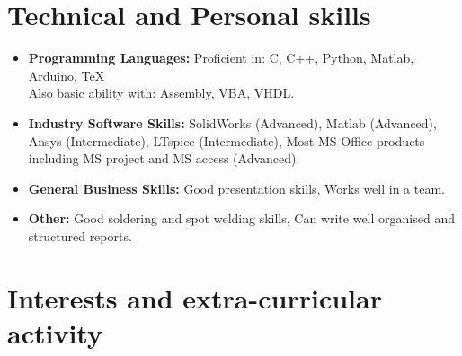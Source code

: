 \documentclass[11pt,a4paper,sans]{moderncv}        %
\begin{document}
\section{Technical and Personal skills}

\vspace{6pt}

\begin{itemize}

\item \textbf{Programming Languages:} Proficient in: C, C++, Python, Matlab, Arduino, TeX \\ Also basic ability with: Assembly, VBA, VHDL.

\vspace{6pt}

\item \textbf{Industry Software Skills:} SolidWorks (Advanced), Matlab (Advanced), Ansys (Intermediate),  LTspice (Intermediate), Most MS Office products including MS project and MS access (Advanced).

\vspace{6pt}

\item \textbf{General Business Skills:} Good presentation skills, Works well in a team.

\vspace{6pt}

\item \textbf{Other:} Good soldering and spot welding skills, Can write well organised and structured reports.

\end{itemize}

\section{Interests and extra-curricular activity}

\vspace{6pt}
\end{document}
